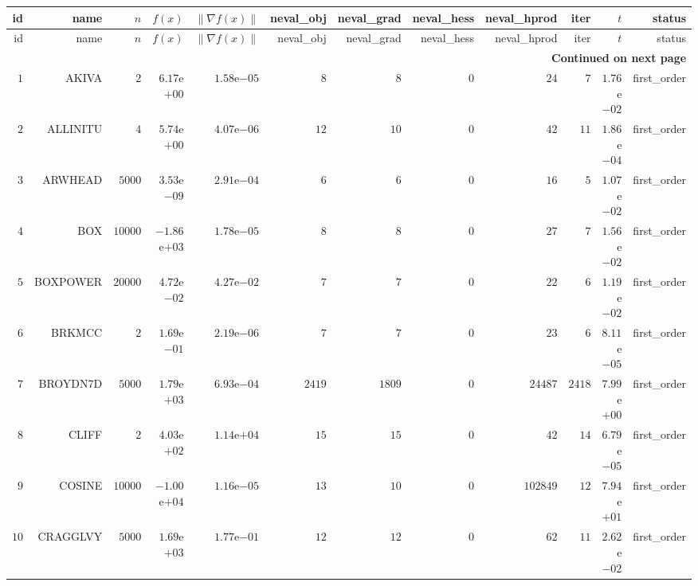 \begin{longtable}{rrrrrrrrrrrr}
  \hline
  id & name & \(n\) & \(f(x)\) & \(\|\nabla f(x)\|\) & neval\_obj & neval\_grad & neval\_hess & neval\_hprod & iter & \(t\) & status \\\hline
  \endfirsthead
  \hline
  id & name & \(n\) & \(f(x)\) & \(\|\nabla f(x)\|\) & neval\_obj & neval\_grad & neval\_hess & neval\_hprod & iter & \(t\) & status \\\hline
  \endhead
  \hline
  \multicolumn{12}{r}{{\bfseries Continued on next page}}\\
  \hline
  \endfoot
  \endlastfoot
  \(     1\) & AKIVA & \(     2\) & \( 6.17\)e\(+00\) & \( 1.58\)e\(-05\) & \(     8\) & \(     8\) & \(     0\) & \(    24\) & \(     7\) & \( 1.76\)e\(-02\) & first\_order \\
  \(     2\) & ALLINITU & \(     4\) & \( 5.74\)e\(+00\) & \( 4.07\)e\(-06\) & \(    12\) & \(    10\) & \(     0\) & \(    42\) & \(    11\) & \( 1.86\)e\(-04\) & first\_order \\
  \(     3\) & ARWHEAD & \(  5000\) & \( 3.53\)e\(-09\) & \( 2.91\)e\(-04\) & \(     6\) & \(     6\) & \(     0\) & \(    16\) & \(     5\) & \( 1.07\)e\(-02\) & first\_order \\
  \(     4\) & BOX & \( 10000\) & \(-1.86\)e\(+03\) & \( 1.78\)e\(-05\) & \(     8\) & \(     8\) & \(     0\) & \(    27\) & \(     7\) & \( 1.56\)e\(-02\) & first\_order \\
  \(     5\) & BOXPOWER & \( 20000\) & \( 4.72\)e\(-02\) & \( 4.27\)e\(-02\) & \(     7\) & \(     7\) & \(     0\) & \(    22\) & \(     6\) & \( 1.19\)e\(-02\) & first\_order \\
  \(     6\) & BRKMCC & \(     2\) & \( 1.69\)e\(-01\) & \( 2.19\)e\(-06\) & \(     7\) & \(     7\) & \(     0\) & \(    23\) & \(     6\) & \( 8.11\)e\(-05\) & first\_order \\
  \(     7\) & BROYDN7D & \(  5000\) & \( 1.79\)e\(+03\) & \( 6.93\)e\(-04\) & \(  2419\) & \(  1809\) & \(     0\) & \( 24487\) & \(  2418\) & \( 7.99\)e\(+00\) & first\_order \\
  \(     8\) & CLIFF & \(     2\) & \( 4.03\)e\(+02\) & \( 1.14\)e\(+04\) & \(    15\) & \(    15\) & \(     0\) & \(    42\) & \(    14\) & \( 6.79\)e\(-05\) & first\_order \\
  \(     9\) & COSINE & \( 10000\) & \(-1.00\)e\(+04\) & \( 1.16\)e\(-05\) & \(    13\) & \(    10\) & \(     0\) & \(102849\) & \(    12\) & \( 7.94\)e\(+01\) & first\_order \\
  \(    10\) & CRAGGLVY & \(  5000\) & \( 1.69\)e\(+03\) & \( 1.77\)e\(-01\) & \(    12\) & \(    12\) & \(     0\) & \(    62\) & \(    11\) & \( 2.62\)e\(-02\) & first\_order \\

\end{longtable}
